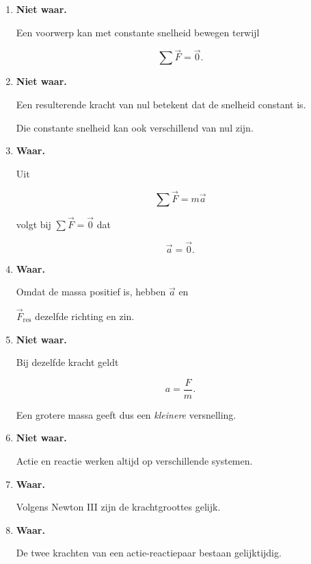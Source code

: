 \documentclass{ximera}
\begin{document}
\begin{oefening}{\oefB\ESS}
\begin{oplossing}
\begin{enumerate}

  \item \textbf{Niet waar.}

  Een voorwerp kan met constante snelheid bewegen terwijl

  \[\sum\vec F=\vec0.\]

  \item \textbf{Niet waar.}

  Een resulterende kracht van nul betekent dat de snelheid constant is.

  Die constante snelheid kan ook verschillend van nul zijn.

  \item \textbf{Waar.}

  Uit

  \[\sum\vec F=m\vec a\]

  volgt bij $\sum\vec F=\vec0$ dat

  \[\vec a=\vec0.\]

  \item \textbf{Waar.}

  Omdat de massa positief is, hebben $\vec a$ en

  $\vec F_{\mathrm{res}}$ dezelfde richting en zin.

  \item \textbf{Niet waar.}

  Bij dezelfde kracht geldt

  \[a=\frac{F}{m}.\]

  Een grotere massa geeft dus een \emph{kleinere} versnelling.

  \item \textbf{Niet waar.}

  Actie en reactie werken altijd op verschillende systemen.

  \item \textbf{Waar.}

  Volgens Newton III zijn de krachtgroottes gelijk.

  \item \textbf{Waar.}

  De twee krachten van een actie-reactiepaar bestaan gelijktijdig.

\end{enumerate}

\end{oplossing}

\end{oefening}
\end{document}
